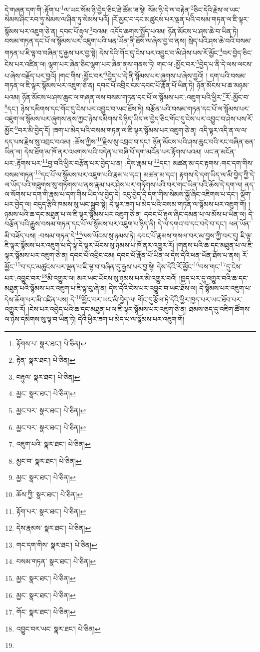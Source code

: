 དེ་གཞན་དག་གི་:རྟོག་པ་\footnote{རྟོགས་པ་  སྣར་ཐང་།  པེ་ཅིན། }ལ་ཡང་སོམ་ཉི་བྱེད་ཅིང་ཐེ་ཚོམ་ཟ་སྟེ། སོམ་ཉི་དེ་ལ་བརྟེན་\footnote{རྟེན་  སྣར་ཐང་།  པེ་ཅིན། }ཅིང་དེའི་རྗེས་ལ་ཡང་སེམས་ཤིང་རབ་ཏུ་སེམས་ལ་ཤིན་ཏུ་སེམས་པའོ། །རོ་མྱང་བ་དང་མཚུངས་པར་ལྡན་པའི་བསམ་གཏན་ལ་ཇི་ལྟར་སྙོམས་པར་འཇུག་ཅེ་ན། དབང་པོ་རྟུལ་\footnote{བརྟུལ་  སྣར་ཐང་།  པེ་ཅིན། }བའམ། འདོད་ཆགས་སྤྱོད་པའམ། ཉོན་མོངས་པ་ཤས་ཆེ་བ་ཡིན་ཏེ། བསམ་གཏན་དང་པོ་ལ་སྙོམས་པར་འཇུག་པའི་ཕན་ཡོན་ནི་ཐོས་ལ་ཞེས་བྱ་བ་ནས། སྲེད་པའི་ཤས་ཆེ་བའི་བསམ་གཏན་པ་ཇི་ལྟ་བ་བཞིན་དུ་རྒྱས་པར་བྱ་སྟེ། དེས་དེའི་གོང་དུ་ངེས་པར་འབྱུང་བ་མི་ཤེས་པས་རོ་མྱོང་\footnote{མྱང་  སྣར་ཐང་།  པེ་ཅིན། }བར་བྱེད་ཅིང་ངེས་པར་འཛིན་ལ། ལྷག་པར་ཞེན་ཅིང་ལྷག་པར་ཞེན་ནས་གནས་ཏེ། གང་ལ་:མྱོང་བར་\footnote{མྱང་བར་  སྣར་ཐང་།  པེ་ཅིན། }བྱེད་པ་ནི་དེ་ལས་ལངས་པ་ཞེས་བརྗོད་པར་བྱའོ། །གང་གིས་:མྱོང་བར་\footnote{མྱང་བར་  སྣར་ཐང་།  པེ་ཅིན། }བྱེད་པ་དེ་ནི་སྙོམས་པར་ཞུགས་པ་ཞེས་བྱའོ། །
དག་པའི་བསམ་གཏན་ལ་ཇི་ལྟར་སྙོམས་པར་འཇུག་ཅེ་ན། དབང་པོ་འབྲིང་ངམ་དབང་པོ་རྣོན་པོ་ཡིན་ཏེ། ཉོན་མོངས་པ་ཆ་མཉམ་པའམ། ཉོན་མོངས་པ་ཤས་ཆུང་ལ་གཞན་ལས་བསམ་གཏན་དང་པོ་ལ་སྙོམས་པར་:འཇུག་པའི་ཕྱིར་\footnote{འཇུག་པའི་  སྣར་ཐང་།  པེ་ཅིན། }རོ་:མྱོང་བ་\footnote{མྱང་བ་  སྣར་ཐང་།  པེ་ཅིན། }དང་། ཉེས་དམིགས་དང་གོང་དུ་ངེས་པར་འབྱུང་བ་ཡང་ཐོས་ཏེ། བརྩོན་པའི་བསམ་གཏན་དང་པོ་ལ་སྙོམས་པར་འཇུག་ལ་སྙོམས་པར་ཞུགས་ནས་ཀྱང་ཉེས་དམིགས་དེ་ཉིད་ཡིད་ལ་བྱེད་ཅིང་གོང་དུ་ངེས་པར་འབྱུང་བ་ཤེས་པས་རོ་མྱོང་\footnote{མྱང་  སྣར་ཐང་།  པེ་ཅིན། }བར་མི་བྱེད་དོ། །ཟག་པ་མེད་པའི་བསམ་གཏན་ལ་ཇི་ལྟར་སྙོམས་པར་འཇུག་ཅེ་ན། འདི་ལྟར་འདི་ན་ལ་ལ་དད་པས་རྗེས་སུ་འབྲང་བའམ། :ཆོས་ཀྱིས་\footnote{ཆོས་ཀྱི་  སྣར་ཐང་།  པེ་ཅིན། }རྗེས་སུ་འབྲང་བ་དང་། ཉོན་མོངས་པའི་ཤས་ཆུང་བའི་རང་བཞིན་ཅན་ཡིན་ལ། དེས་ཐོག་མ་ཁོ་ནར་འཕགས་པའི་བདེན་པ་བཞི་པོ་དག་མངོན་པར་རྟོགས་པའམ། ཡང་ན་མངོན་པར་:རྟོགས་པར་\footnote{རྟོག་པར་  སྣར་ཐང་།  པེ་ཅིན། }བྱ་བའི་ཕྱིར་བརྩོན་པར་བྱེད་པ་ན། :དེས་རྣམ་པ་\footnote{དེས་རྣམས་  སྣར་ཐང་།  པེ་ཅིན། }དང་། མཚན་མ་དང་རྟགས་:གང་དག་གིས་བསམ་གཏན་\footnote{གང་དག་གིས་  སྣར་ཐང་།  པེ་ཅིན། }དང་པོ་ལ་སྙོམས་པར་འཇུག་པའི་རྣམ་པ་དང་། མཚན་མ་དང་། རྟགས་དེ་དག་ཡིད་ལ་མི་བྱེད་ཀྱི་དེ་ལ་ཡོད་པའི་གཟུགས་སུ་གཏོགས་པ་ནས་རྣམ་པར་ཤེས་པར་གཏོགས་པའི་བར་གང་ཡིན་པའི་ཆོས་དེ་དག་ལ། ནད་ལ་སོགས་པ་དག་གི་རྣམ་པ་དག་གིས་ཡིད་ལ་བྱེད་དེ། འདུ་བྱེད་དེ་དག་གིས་སེམས་སྐྱོ་ཞིང་འཇིགས་པ་དང་། ལྡོག་པར་བྱེད་ལ། བདུད་རྩིའི་ཁམས་སུ་ཡང་སྒྲུབ་སྟེ། དེ་ལྟར་ཟག་པ་མེད་པའི་བསམ་གཏན་ལ་སྙོམས་པར་འཇུག་གོ། །ཉམས་པའི་ཆ་དང་མཐུན་པ་ལ་ཇི་ལྟར་སྙོམས་པར་འཇུག་ཅེ་ན། དབང་པོ་རྟུལ་ཞིང་དམན་པ་ལ་མོས་པ་ཡིན་ལ། དེ་བརྩོན་པའི་རྒྱུས་བསམ་གཏན་དང་པོ་ལ་སྙོམས་པར་འཇུག་པ་ཉིད་ནི། དེ་ལ་དགའ་བ་དང་བདེ་བ་དང་། ཕན་ཡོན་མི་བཟོད་པས། :བསམ་གཏན་དེ་\footnote{བསམ་གཏན་  སྣར་ཐང་།  པེ་ཅིན། }ལས་ཡོངས་སུ་ཉམས་ཏེ། དབང་པོ་རྣམས་གསལ་བར་མ་བྱས་ཀྱི་བར་དུ། ཇི་ལྟ་ཇི་ལྟར་སྙོམས་པར་འཇུག་པ་དེ་ལྟ་དེ་ལྟར་ཡོངས་སུ་ཉམས་པ་ཁོ་ནར་འགྱུར་རོ། །གནས་པའི་ཆ་དང་མཐུན་པ་ལ་ཇི་ལྟར་སྙོམས་པར་འཇུག་ཅེ་ན། དབང་པོ་འབྲིང་ངམ། དབང་པོ་རྣོན་པོ་ཡིན་ལ་དེས་དེའི་ཕན་ཡོན་ཐོས་པ་ནས། རོ་མྱོང་\footnote{མྱང་  སྣར་ཐང་།  པེ་ཅིན། }བ་དང་མཚུངས་པར་ལྡན་པ་ཇི་ལྟ་བ་བཞིན་དུ་རྒྱས་པར་བྱ་སྟེ། དེས་དེའི་རོ་མྱོང་\footnote{མྱང་  སྣར་ཐང་།  པེ་ཅིན། }བས་གང་\footnote{གོང་  སྣར་ཐང་།  པེ་ཅིན། }དུ་ངེས་པར་:འབྱུང་བར་\footnote{འབྱུང་བར་ཡང་  སྣར་ཐང་།  པེ་ཅིན། }མི་འགྱུར་ལ། མར་ཡང་ཡོངས་སུ་ཉམས་པར་མི་འགྱུར་བའོ། །ཁྱད་པར་དུ་འགྱུར་བའི་ཆ་དང་མཐུན་པའི་སྙོམས་པར་འཇུག་པ་ཇི་ལྟ་བུ་ཞེ་ན། དེས་དེའི་ངེས་པར་འབྱུང་བ་ཡང་ཐོས་ལ། དེ་སྙོམས་པར་འཇུག་པ་དེས་ཆོག་པར་མི་འཛིན་པས། དེ་\footnote{}མྱོང་བར་ཡང་མི་བྱེད་ལ། གོང་དུ་རྩོལ་ཏེ་དེའི་ཕྱིར་ཁྱད་པར་ཡང་ཐོབ་པར་འགྱུར་རོ། །ངེས་པར་འབྱེད་པའི་ཆ་དང་མཐུན་པ་ལ་ཇི་ལྟར་སྙོམས་པར་འཇུག་ཅེ་ན། ཐམས་ཅད་དུ་འཇིག་ཚོགས་ལ་ཉེས་དམིགས་སུ་ལྟ་བ་ཡིན་ཏེ། དེའི་ཕྱིར་ཟག་པ་མེད་པ་ལ་སྙོམས་པར་འཇུག་གོ། 